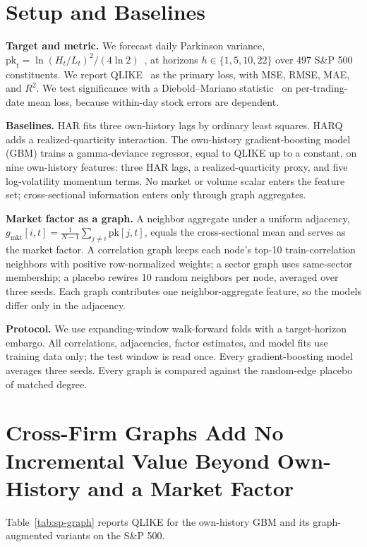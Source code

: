 \documentclass{llncs}
\begin{document}
\section{Setup and Baselines}
\textbf{Target and metric.} We forecast daily Parkinson variance, $\mathrm{pk}_t=\ln(H_t/L_t)^2/(4\ln 2)$~\cite{parkinson1980}, at horizons
$h\in\{1,5,10,22\}$ over 497 S\&P 500 constituents. We report QLIKE~\cite{patton2011} as the primary loss, with MSE, RMSE, MAE, and
$R^2$. We test significance with a Diebold--Mariano statistic~\cite{dm1995} on per-trading-date mean loss, because within-day
stock errors are dependent.

\textbf{Baselines.} HAR fits three own-history lags by ordinary least squares. HARQ adds a realized-quarticity
interaction. The own-history gradient-boosting model (GBM) trains a gamma-deviance regressor, equal to QLIKE up to
a constant, on nine own-history features: three HAR lags, a realized-quarticity proxy, and five log-volatility
momentum terms. No market or volume scalar enters the feature set; cross-sectional information enters only through
graph aggregates.

\textbf{Market factor as a graph.} A neighbor aggregate under a uniform adjacency, $g_{\mathrm{mkt}}[i,t]=\frac{1}{N-1}
\sum_{j\ne i}\mathrm{pk}[j,t]$, equals the cross-sectional mean and serves as the market factor. A correlation
graph keeps each node's top-10 train-correlation neighbors with positive row-normalized weights; a sector graph
uses same-sector membership; a placebo rewires 10 random neighbors per node, averaged over three seeds. Each
graph contributes one neighbor-aggregate feature, so the models differ only in the adjacency.

\textbf{Protocol.} We use expanding-window walk-forward folds with a target-horizon embargo. All correlations,
adjacencies, factor estimates, and model fits use training data only; the test window is read once. Every
gradient-boosting model averages three seeds. Every graph is compared against the random-edge placebo of matched
degree.

\section{Cross-Firm Graphs Add No Incremental Value Beyond Own-History and a Market Factor}
Table~\ref{tab:sp-graph} reports QLIKE for the own-history GBM and its graph-augmented variants on the S\&P 500.
\end{document}
